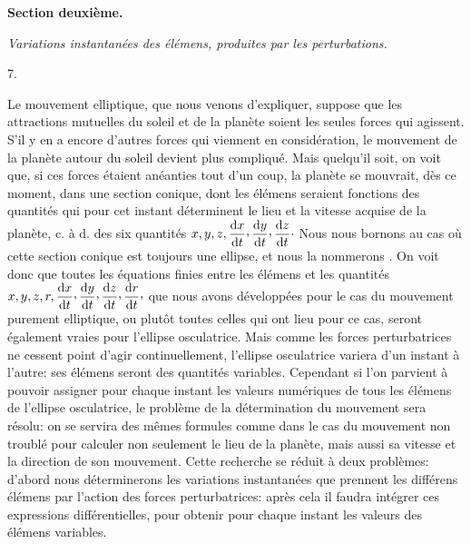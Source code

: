 \par{}\bigskip
{}
\begin{center}
{\large\bfseries Section deuxième.\par}
\medskip
\textit{Variations instantanées des élémens, produites par les perturbations.}
\end{center}
\begin{center}7.\end{center}
\noindent\hspace*{\parindent}Le mouvement elliptique, que nous venons d’expliquer, suppose que les attractions mutuelles du soleil et de la planète soient les seules forces qui agissent. S’il y en a encore d’autres forces qui viennent en considération, le mouvement de la planète autour du soleil devient plus compliqué. Mais quelqu’il soit, on voit que, si ces forces étaient anéanties tout d’un coup, la planète se mouvrait, dès ce moment, dans une section conique, dont les élémens seraient fonctions des quantités qui pour cet instant déterminent le lieu et la vitesse acquise de la planète, c. à d. des six quantités \(x,y,z,\dfrac{\mathrm{d}x}{\mathrm{d}t}\mathpunct{\raisebox{.45ex}{,}}\dfrac{\mathrm{d}y}{\mathrm{d}t}\mathpunct{\raisebox{.45ex}{,}}\dfrac{\mathrm{d}z}{\mathrm{d}t}\mathpunct{\cdot}\) Nous nous bornons au cas où cette section conique est toujours une ellipse, et nous la nommerons . On voit donc que toutes les équations finies entre les élémens et les quantités \(x,y,z,r,\dfrac{\mathrm{d}x}{\mathrm{d}t}\mathpunct{\raisebox{.45ex}{,}}\dfrac{\mathrm{d}y}{\mathrm{d}t}\mathpunct{\raisebox{.45ex}{,}}\dfrac{\mathrm{d}z}{\mathrm{d}t}\mathpunct{\raisebox{.45ex}{,}}\dfrac{\mathrm{d}r}{\mathrm{d}t}\mathpunct{\raisebox{.45ex}{,}}\) que nous avons développées pour le cas du mouvement purement elliptique, ou plutôt toutes celles qui ont lieu pour ce cas, seront également vraies pour l’ellipse osculatrice. Mais comme les forces perturbatrices ne cessent point d’agir continuellement, l’ellipse osculatrice variera d’un instant à l’autre: ses élémens seront des quantités variables. Cependant si l’on parvient à pouvoir assigner pour chaque instant les valeurs numériques de tous les élémens de l’ellipse osculatrice, le problème de la détermination du mouvement sera résolu: on se servira des mêmes formules comme dans le cas du mouvement non troublé pour calculer non seulement le lieu de la planète, mais aussi sa vitesse et la direction de son mouvement. Cette recherche se réduit à deux problèmes: d’abord nous déterminerons les variations instantanées que prennent les différens élémens par l’action des forces perturbatrices: après cela il faudra intégrer ces expressions différentielles, pour obtenir pour chaque instant les valeurs des élémens variables.
